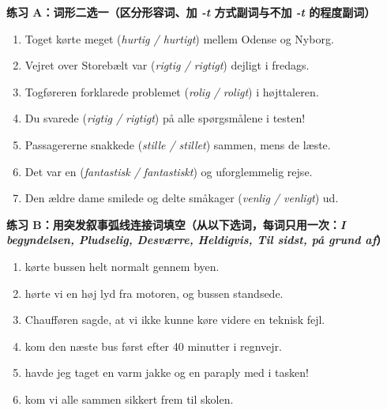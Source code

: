 
\textbf{练习 A：词形二选一（区分形容词、加 \textit{-t} 方式副词与不加 \textit{-t} 的程度副词）}
\begin{enumerate}
  \item Toget kørte meget \underline{\hspace{2.2cm}} (\textit{hurtig / hurtigt}) mellem Odense og Nyborg.
  \item Vejret over Storebælt var \underline{\hspace{2.2cm}} (\textit{rigtig / rigtigt}) dejligt i fredags.
  \item Togføreren forklarede problemet \underline{\hspace{2.2cm}} (\textit{rolig / roligt}) i højttaleren.
  \item Du svarede \underline{\hspace{2.2cm}} (\textit{rigtig / rigtigt}) på alle spørgsmålene i testen!
  \item Passagererne snakkede \underline{\hspace{2.2cm}} (\textit{stille / stillet}) sammen, mens de læste.
  \item Det var en \underline{\hspace{2.2cm}} (\textit{fantastisk / fantastiskt}) og uforglemmelig rejse.
  \item Den ældre dame smilede og delte småkager \underline{\hspace{2.2cm}} (\textit{venlig / venligt}) ud.
\end{enumerate}

\textbf{练习 B：用突发叙事弧线连接词填空（从以下选词，每词只用一次：\textit{I begyndelsen, Pludselig, Desværre, Heldigvis, Til sidst, på grund af}）}
\begin{enumerate}
  \item \underline{\hspace{2.6cm}} kørte bussen helt normalt gennem byen.
  \item \underline{\hspace{2.6cm}} hørte vi en høj lyd fra motoren, og bussen standsede.
  \item Chaufføren sagde, at vi ikke kunne køre videre \underline{\hspace{2.6cm}} en teknisk fejl.
  \item \underline{\hspace{2.6cm}} kom den næste bus først efter 40 minutter i regnvejr.
  \item \underline{\hspace{2.6cm}} havde jeg taget en varm jakke og en paraply med i tasken!
  \item \underline{\hspace{2.6cm}} kom vi alle sammen sikkert frem til skolen.
\end{enumerate}

